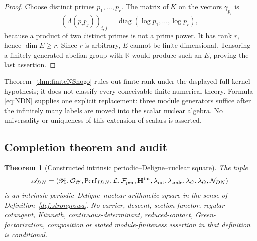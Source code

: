 \documentclass[11pt]{amsart}
\newtheorem{theorem}{Theorem}[section]
\theoremstyle{definition}
\theoremstyle{remark}
\newcommand{\R}{\mathbb R}
\begin{document}
\begin{proof}
Choose distinct primes $p_1,\ldots,p_r$.  The matrix of $K$ on the vectors
$\gamma_{p_i}$ is
\[
 (\Lambda(p_ip_j))_{i,j}
   =\operatorname{diag}(\log p_1,\ldots,\log p_r),
\]
because a product of two distinct primes is not a prime power.  It has rank
$r$, hence $\dim E\geq r$.  Since $r$ is arbitrary, $E$ cannot be finite
dimensional.  Tensoring a finitely generated abelian group with $\R$ would
produce such an $E$, proving the last assertion.
\end{proof}

Theorem~\ref{thm:finiteNSnogo} rules out finite rank under the displayed
full-kernel hypothesis; it does not classify every conceivable finite
numerical theory.  Formula \eqref{eq:NDN} supplies one explicit replacement:
three module generators suffice after the infinitely many labels are moved
into the scalar nuclear algebra.  No universality or uniqueness of this
extension of scalars is asserted.

\subsection{Completion theorem and audit}

\begin{theorem}[Constructed intrinsic periodic--Deligne--nuclear square]
\label{thm:rowaDN}
The tuple
\begin{equation}\label{eq:ADN}
 \mathscr A_{DN}=
 (\mathscr Y_{\mathbb S},\mathcal O_{\mathscr Y},
  \operatorname{Perf}_{IDN},\mathcal L,\mathcal F_{\rm per},
  \mathbf H^{\rm int},\lambda_{\rm int},\lambda_{\mathrm{code}},
  \lambda_C,\lambda_G,\mathcal N_{DN})
\end{equation}
is an intrinsic periodic--Deligne--nuclear arithmetic square in the sense
of Definition~\ref{def:strongrowa}.  No carrier, descent, section-functor,
regular-cotangent, K\"unneth, continuous-determinant, reduced-contact,
Green-factorization, composition or stated module-finiteness assertion in
that definition is conditional.
\end{theorem}
\end{document}
